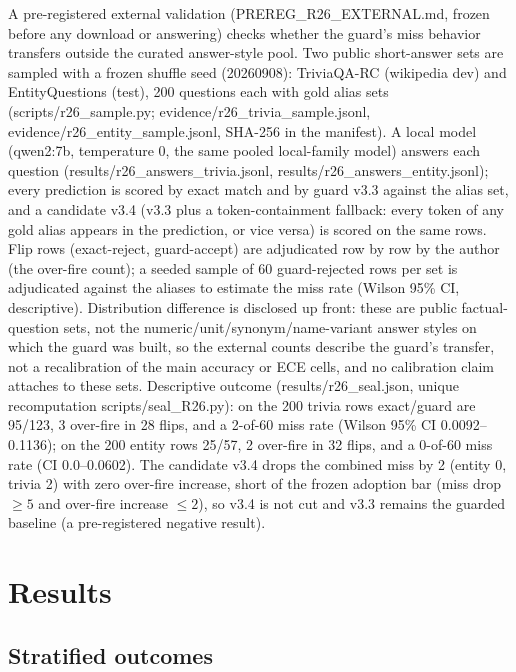 \documentclass[10pt]{article} %
\begin{document}
A pre-registered external validation (PREREG\_R26\_EXTERNAL.md, frozen before any download or answering) checks whether the guard's miss behavior transfers outside the curated answer-style pool. Two public short-answer sets are sampled with a frozen shuffle seed (20260908): TriviaQA-RC (wikipedia dev) and EntityQuestions (test), 200 questions each with gold alias sets (scripts/r26\_sample.py; evidence/r26\_trivia\_sample.jsonl, evidence/r26\_entity\_sample.jsonl, SHA-256 in the manifest). A local model (qwen2:7b, temperature 0, the same pooled local-family model) answers each question (results/r26\_answers\_trivia.jsonl, results/r26\_answers\_entity.jsonl); every prediction is scored by exact match and by guard v3.3 against the alias set, and a candidate v3.4 (v3.3 plus a token-containment fallback: every token of any gold alias appears in the prediction, or vice versa) is scored on the same rows. Flip rows (exact-reject, guard-accept) are adjudicated row by row by the author (the over-fire count); a seeded sample of 60 guard-rejected rows per set is adjudicated against the aliases to estimate the miss rate (Wilson 95\% CI, descriptive). Distribution difference is disclosed up front: these are public factual-question sets, not the numeric/unit/synonym/name-variant answer styles on which the guard was built, so the external counts describe the guard's transfer, not a recalibration of the main accuracy or ECE cells, and no calibration claim attaches to these sets. Descriptive outcome (results/r26\_seal.json, unique recomputation scripts/seal\_R26.py): on the 200 trivia rows exact/guard are 95/123, 3 over-fire in 28 flips, and a 2-of-60 miss rate (Wilson 95\% CI 0.0092--0.1136); on the 200 entity rows 25/57, 2 over-fire in 32 flips, and a 0-of-60 miss rate (CI 0.0--0.0602). The candidate v3.4 drops the combined miss by 2 (entity 0, trivia 2) with zero over-fire increase, short of the frozen adoption bar (miss drop \(\geq5\) and over-fire increase \(\leq2\)), so v3.4 is not cut and v3.3 remains the guarded baseline (a pre-registered negative result).

\section{Results}
\label{sec:results}

\subsection{Stratified outcomes}
\end{document}
